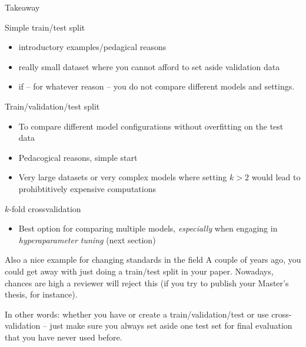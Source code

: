 \documentclass[compress]{beamer}
\begin{document}
\begin{frame}[allowframebreaks]{Takeaway}

\begin{block}{Simple train/test split}
\begin{itemize}
	\item introductory examples/pedagical reasons
	\item really small dataset where you cannot afford to set aside validation data
	\item if -- for whatever reason -- you do not compare different models and settings.
\end{itemize}
\end{block}

\framebreak

\begin{block}{Train/validation/test split}
	\begin{itemize}
		\item To compare different model configurations without overfitting on the test data
		\item Pedacogical reasons, simple start
		\item Very large datasets or very complex models where setting $k>2$ would lead to prohibtitively expensive computations
	\end{itemize}
\end{block}

\framebreak

\begin{block}{$k$-fold crossvalidation}
	\begin{itemize}
		\item Best option for comparing multiple models, \emph{especially} when engaging in \emph{hyperaparameter tuning} (next section)
	\end{itemize}
\end{block}

\pause
\begin{alertblock}{Also a nice example for changing standards in the field}
A couple of years ago, you could get away with just doing a train/test split in your paper. Nowadays, chances are high a reviewer will reject this (if you try to publish your Master's thesis, for instance).
\end{alertblock}


\end{frame}



\begin{frame}[standout]
In other words: whether you have or create a train/validation/test or use cross-validation -- just make sure you always set aside one test set for final evaluation that you have never used before.
\end{frame}
\end{document}
